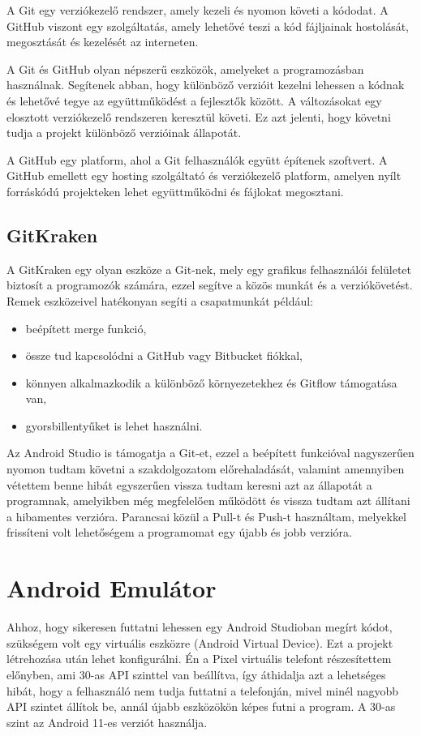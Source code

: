 \documentclass{thesis-ekf}
\begin{document}
	A Git egy verziókezelő rendszer, amely kezeli és nyomon követi a kódodat. A GitHub viszont egy szolgáltatás, amely lehetővé teszi a kód fájljainak hostolását, megosztását és kezelését az interneten.
	
	A Git és GitHub olyan népszerű eszközök, amelyeket a programozásban használnak. Segítenek abban, hogy különböző verzióit kezelni lehessen a kódnak és lehetővé tegye az együttműködést a fejlesztők között. A változásokat egy elosztott verziókezelő rendszeren keresztül követi. Ez azt jelenti, hogy követni tudja a projekt különböző verzióinak állapotát.
	
	A GitHub egy platform, ahol a Git felhasználók együtt építenek szoftvert. A GitHub emellett egy hosting szolgáltató és verziókezelő platform, amelyen nyílt forráskódú projekteken lehet együttműködni és fájlokat megosztani. \cite{github}
	
	\subsection{GitKraken}
	A GitKraken egy olyan eszköze a Git-nek, mely egy grafikus felhasználói felületet biztosít a programozók számára, ezzel segítve a közös munkát és a verziókövetést. Remek eszközeivel hatékonyan segíti a csapatmunkát például:
	\begin{itemize}
		\item beépített merge funkció,
		\item össze tud kapcsolódni a GitHub vagy Bitbucket fiókkal,
		\item könnyen alkalmazkodik a különböző környezetekhez és Gitflow támogatása van,
		\item gyorsbillentyűket is lehet használni. \cite{gitkraken}
	\end{itemize}
	
	Az Android Studio is támogatja a Git-et, ezzel a beépített funkcióval nagyszerűen nyomon tudtam követni a szakdolgozatom előrehaladását, valamint amennyiben vétettem benne hibát egyszerűen vissza tudtam keresni azt az állapotát a programnak, amelyikben még megfelelően működött és vissza tudtam azt állítani a hibamentes verzióra. Parancsai közül a Pull-t és Push-t használtam, melyekkel frissíteni volt lehetőségem a programomat egy újabb és jobb verzióra.
	
	\section{Android Emulátor}
	Ahhoz, hogy sikeresen futtatni lehessen egy Android Studioban megírt kódot, szükségem volt egy virtuális eszközre (Android Virtual Device). Ezt a projekt létrehozása után lehet konfigurálni. Én a Pixel virtuális telefont részesítettem előnyben, ami 30-as API szinttel van beállítva, így áthidalja azt a lehetséges hibát, hogy a felhasználó nem tudja futtatni a telefonján, mivel minél nagyobb API szintet állítok be, annál újabb eszközökön képes futni a program. A 30-as szint az Android 11-es verziót használja.
	
\end{document}
